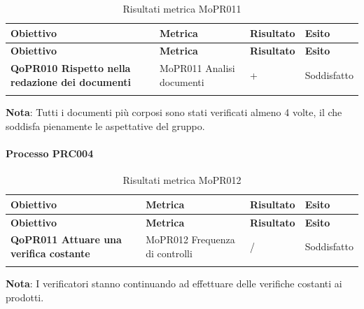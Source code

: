 \documentclass[../piano-di-qualifica.tex]{subfiles}
\begin{document}
\renewcommand{\arraystretch}{2} %
\begin{longtable}[H]{>{\centering\bfseries}m{5cm} >{\centering}m{5cm} >{\centering}m{2.5cm} >{\centering\arraybackslash}m{2.5cm}}  
  \rowcolor{lightgray}
  {\textbf{Obiettivo}} & {\textbf{Metrica}} & {\textbf{Risultato}} & {\textbf{Esito}}  \\
  \endfirsthead%
  \rowcolor{lightgray}
  {\textbf{Obiettivo}} & {\textbf{Metrica}} & {\textbf{Risultato}} & {\textbf{Esito}}  \\
  \endhead%
  \textbf{QoPR010 Rispetto nella redazione dei documenti} & MoPR011 Analisi documenti & 4+ & Soddisfatto \\
  \caption{Risultati metrica MoPR011}
  \label{tab:my-table}
\end{longtable}
\textbf{Nota}: Tutti i documenti più corposi sono stati verificati almeno 4 volte, il che soddisfa pienamente le aspettative del gruppo.

\paragraph{Processo PRC004}
\label{sub:processo_PRC004}

\renewcommand{\arraystretch}{2} %
\begin{longtable}[H]{>{\centering\bfseries}m{5cm} >{\centering}m{5cm} >{\centering}m{2.5cm} >{\centering\arraybackslash}m{2.5cm}}  
  \rowcolor{lightgray}
  {\textbf{Obiettivo}} & {\textbf{Metrica}} & {\textbf{Risultato}} & {\textbf{Esito}}  \\
  \endfirsthead%
  \rowcolor{lightgray}
  {\textbf{Obiettivo}} & {\textbf{Metrica}} & {\textbf{Risultato}} & {\textbf{Esito}}  \\
  \endhead%
  \textbf{QoPR011 Attuare una verifica costante} & MoPR012 Frequenza di controlli & / & Soddisfatto \\
  \caption{Risultati metrica MoPR012}
  \label{tab:my-table}
\end{longtable}
\textbf{Nota}: I verificatori stanno continuando ad effettuare delle verifiche costanti ai prodotti.
\end{document}
